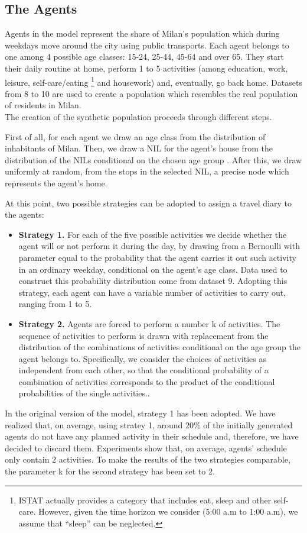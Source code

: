  \subsection{The Agents}\label{sec3}
 
Agents in the model represent the share of Milan's population which during weekdays move around the city using public transports. Each agent belongs to one among 4 possible age classes: 15-24, 25-44, 45-64 and over 65. They start their daily routine at home, perform 1 to 5 activities (among education, work, leisure, self-care/eating \footnote{ISTAT actually provides a category that includes eat, sleep and other self-care. However, given the time horizon we consider (5:00 a.m  to 1:00 a.m), we assume that “sleep” can be neglected.} and housework) and, eventually, go back home. Datasets from 8 to 10 are used to create a population which resembles the real population of residents in Milan.  \\
The creation of the synthetic population proceeds through different steps.

First of all, for each agent we draw an age class from the distribution of inhabitants of Milan. Then, we draw a NIL for the agent's house from the distribution of the NILs conditional on the chosen age group \cite{site18}. After this, we draw uniformly at random, from the stops in the selected NIL, a precise node which represents the agent’s home. 

At this point, two possible strategies can be adopted to assign a travel diary to the agents:
\begin{itemize}
    \item \textbf{Strategy 1.} For each of the five possible activities we decide whether the agent will or not perform it during the day, by drawing from a Bernoulli with parameter equal to the probability that the agent carries it out such activity in an ordinary weekday, conditional on the agent's age class. Data used to construct this probability distribution come from dataset 9. Adopting this strategy, each agent can have a variable number of activities to carry out, ranging from 1 to 5.
    \item \textbf{Strategy 2.} Agents are forced to perform a number k of activities. The sequence of activities to perform is  drawn with replacement from the distribution of the combinations of activities conditional on the age group the agent belongs to. Specifically, we consider the choices of activities as independent from each other, so that the conditional probability of a combination of activities corresponds to the product of the conditional probabilities of the single activities..
\end{itemize}
In the original version of the model, strategy 1 has been adopted. We have realized that, on average, using stratey 1, around $20\%$ of the initially generated agents do not have any planned activity in their schedule and, therefore, we have decided to discard them. Experiments show that, on average, agents' schedule only contain 2 activities. To make the results of the two strategies comparable, the parameter k for the second strategy has been set to 2.

